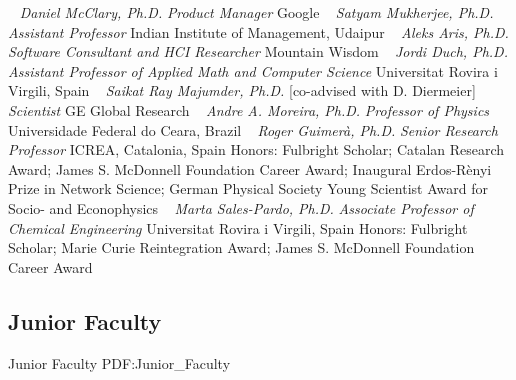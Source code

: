 ~
\Gap{}
\textit{Daniel McClary, Ph.D.}
\newline
    \textit{Product Manager}
    \newline
    Google
    \newline
~
\Gap{}
\textit{Satyam Mukherjee, Ph.D.}
\newline
    \textit{Assistant Professor}
    \newline
    Indian Institute of Management, Udaipur
    \newline
~
\Gap{}
\textit{Aleks Aris, Ph.D.}
\newline
    \textit{Software Consultant and HCI Researcher}
    \newline
    Mountain Wisdom
    \newline
~
\Gap{}
\textit{Jordi Duch, Ph.D.}
\newline
    \textit{Assistant Professor of Applied Math and Computer Science}
    \newline
    Universitat Rovira i Virgili, Spain
    \newline
~
\Gap{}
\textit{Saikat Ray Majumder, Ph.D.}
    [co-advised with D. Diermeier]
\newline
    \textit{Scientist}
    \newline
    GE Global Research
    \newline
~
\Gap{}
\textit{Andre A. Moreira, Ph.D.}
\newline
    \textit{Professor of Physics}
    \newline
    Universidade Federal do Ceara, Brazil
    \newline
~
\Gap{}
\textit{Roger Guimer\`a, Ph.D.}
\newline
    \textit{Senior Research Professor}
    \newline
    ICREA, Catalonia, Spain
    \newline
    {\footnotesize Honors: Fulbright Scholar; Catalan Research Award; James S. McDonnell Foundation Career Award;  Inaugural Erdos-R\`enyi Prize in Network Science; German Physical Society Young Scientist Award for Socio- and Econophysics}
    \newline
~
\Gap{}
\textit{Marta Sales-Pardo, Ph.D.}
\newline
    \textit{Associate Professor of Chemical Engineering}
    \newline
    Universitat Rovira i Virgili, Spain
    \newline
    {\footnotesize Honors: Fulbright Scholar; Marie Curie Reintegration Award; James S. McDonnell Foundation Career Award}
    \newline
~
\Gap\vspace*{0.2cm}\subsection
{Junior Faculty}
{Junior Faculty}
{PDF:Junior_Faculty}

